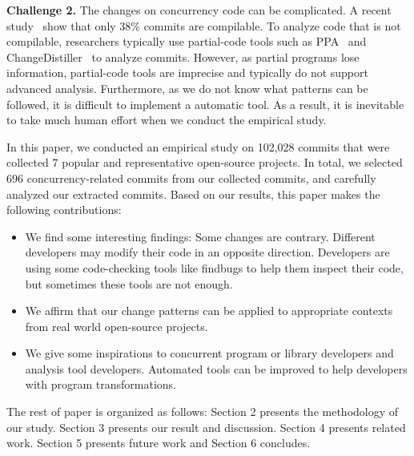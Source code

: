 \noindent
\textbf{Challenge 2.} The changes on concurrency code can be complicated. A recent study~\cite{tufano2016there} show that only 38\% commits are compilable. To analyze code that is not compilable, researchers typically use partial-code tools such as PPA~\cite{DagenaisH08ppa} and ChangeDistiller~\cite{fluri2007change} to analyze commits. However, as partial programs lose information, partial-code tools are imprecise and typically do not support advanced analysis. Furthermore, as we do not know what patterns can be followed, it is difficult to implement a automatic tool. As a result, it is inevitable to take much human effort when we conduct the empirical study.

In this paper, we conducted an empirical study on 102,028 commits that were collected 7 popular and representative open-source projects. In total, we selected 696 concurrency-related commits from our collected commits, and carefully analyzed our extracted commits. Based on our results, this paper makes the following contributions:

\begin{itemize}
	\item We find some interesting findings: Some changes are contrary. Different developers may modify their code in an opposite direction. Developers are using some code-checking tools like findbugs to help them inspect their code, but sometimes these tools are not enough.
	\item We affirm that our change patterns can be applied to appropriate  contexts from real world open-source projects.
	\item We give some inspirations to concurrent program or library developers and analysis tool developers. Automated tools can be improved to help developers with program transformations.
\end{itemize}

The rest of paper is organized as follows: Section 2 presents the methodology of our study. Section 3 presents our result and discussion. Section 4 presents related work. Section 5 presents future work and Section 6 concludes.
